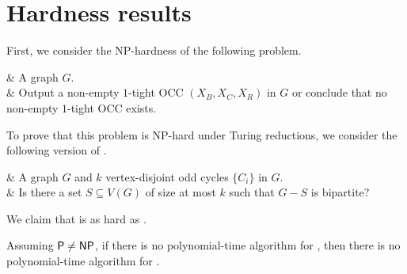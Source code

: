 \section{Hardness results}
\label{sec:hardness}

First, we consider the NP-hardness of the following problem.

\begin{problem}{}
  \Input & A graph $G$.\\
  \Prob & Output a non-empty $1$-tight OCC $(X_B,X_C,X_R)$ in $G$ or conclude that no non-empty $1$-tight OCC exists.
\end{problem}

To prove that this problem is NP-hard under Turing reductions,
we consider the following version of \PrbOCT.

\begin{problem}{}
  \Input & A graph $G$ and $k$ vertex-disjoint odd cycles $\{C_i\}$ in $G$.\\
  \Prob & Is there a set $S \subseteq V(G)$ of size at most $k$ such that $G-S$ is bipartite?
\end{problem}

We claim that  is as hard as .


\begin{lemma}\label{lem:1-tight-occ-reduction}
  Assuming $\textnormal{\textsf{P}} \neq \textnormal{\textsf{NP}}$,
  if there is no polynomial-time algorithm for , then
  there is no polynomial-time algorithm for .
\end{lemma}

